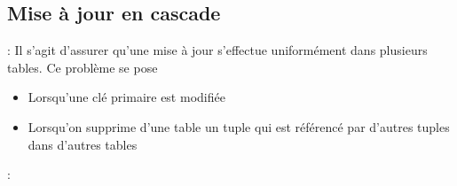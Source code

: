 \documentclass[10pt]{beamer}
\begin{document}
\subsection{Mise à jour en cascade}
\begin{frame}{\secname : \subsecname}
    Il s'agit d'assurer qu'une mise à jour s'effectue uniformément dans plusieurs tables.
    Ce problème se pose
    \begin{itemize}
        \item  Lorsqu'une clé primaire est modifiée
        \item Lorsqu'on supprime d'une table un tuple qui est référencé par d'autres tuples dans d'autres tables
    \end{itemize}
\end{frame}

\begin{frame}{\secname : \subsecname}
    
\end{frame}


\end{document}
